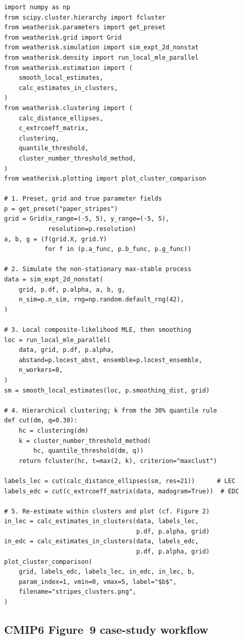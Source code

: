 \documentclass[preprint,12pt,a4paper]{elsarticle}
\newcommand{\rev}[1]{{#1}}
\newcommand{\revb}[1]{{#1}}
\begin{document}
\begin{lstlisting}[caption={Complete synthetic validation
  workflow.}, label=lst:app-validate]
import numpy as np
from scipy.cluster.hierarchy import fcluster
from weatherisk.parameters import get_preset
from weatherisk.grid import Grid
from weatherisk.simulation import sim_expt_2d_nonstat
from weatherisk.density import run_local_mle_parallel
from weatherisk.estimation import (
    smooth_local_estimates,
    calc_estimates_in_clusters,
)
from weatherisk.clustering import (
    calc_distance_ellipses,
    c_extrcoeff_matrix,
    clustering,
    quantile_threshold,
    cluster_number_threshold_method,
)
from weatherisk.plotting import plot_cluster_comparison

# 1. Preset, grid and true parameter fields
p = get_preset("paper_stripes")
grid = Grid(x_range=(-5, 5), y_range=(-5, 5),
            resolution=p.resolution)
a, b, g = (f(grid.X, grid.Y)
           for f in (p.a_func, p.b_func, p.g_func))

# 2. Simulate the non-stationary max-stable process
data = sim_expt_2d_nonstat(
    grid, p.df, p.alpha, a, b, g,
    n_sim=p.n_sim, rng=np.random.default_rng(42),
)

# 3. Local composite-likelihood MLE, then smoothing
loc = run_local_mle_parallel(
    data, grid, p.df, p.alpha,
    abstand=p.locest_abst, ensemble=p.locest_ensemble,
    n_workers=8,
)
sm = smooth_local_estimates(loc, p.smoothing_dist, grid)

# 4. Hierarchical clustering; k from the 30% quantile rule
def cut(dm, q=0.30):
    hc = clustering(dm)
    k = cluster_number_threshold_method(
        hc, quantile_threshold(dm, q))
    return fcluster(hc, t=max(2, k), criterion="maxclust")

labels_lec = cut(calc_distance_ellipses(sm, res=21))      # LEC
labels_edc = cut(c_extrcoeff_matrix(data, madogram=True))  # EDC

# 5. Re-estimate within clusters and plot (cf. Figure 2)
in_lec = calc_estimates_in_clusters(data, labels_lec,
                                    p.df, p.alpha, grid)
in_edc = calc_estimates_in_clusters(data, labels_edc,
                                    p.df, p.alpha, grid)
plot_cluster_comparison(
    grid, labels_edc, labels_lec, in_edc, in_lec, b,
    param_index=1, vmin=0, vmax=5, label="$b$",
    filename="stripes_clusters.png",
)
\end{lstlisting}

\rev{\subsection{CMIP6 Figure~9 \revb{case-study workflow}}}
\end{document}
